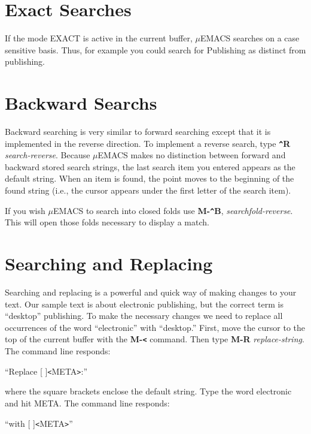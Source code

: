 \section{Exact Searches}

If the mode EXACT is active in the current buffer, $\mu$EMACS searches on a
case sensitive basis. Thus, for example you could search for Publishing
as distinct from publishing.

\section{Backward Searchs}

Backward searching is very similar to forward searching except that it
is implemented in the reverse direction. To implement a reverse search,
type {\bf \verb+^+R} {\it search-reverse}. Because $\mu$EMACS makes no
distinction between forward and backward stored search strings, the
last search item you entered appears as the default string. When an
item is found, the point moves to the beginning of the found string
(i.e., the cursor appears under the first letter of the search item).

If you wish $\mu$EMACS to search into closed folds use {\bf
M-\verb+^+B},  {\it searchfold-reverse}. This will open those folds
necessary to display a match.

\section{Searching and Replacing}

Searching and replacing is a powerful and quick way of making changes
to your text. Our sample text is about electronic publishing, but the
correct term is ``desktop'' publishing. To make the necessary changes
we need to replace all occurrences of the word ``electronic'' with
``desktop.'' First, move the cursor to the top of the current buffer
with the {\bf M-\verb+<+} command. Then type {\bf M-R} {\it replace-string}.
The command line responds:

``Replace [ ]\verb+<+META\verb+>+:''

where the square brackets enclose the default string. Type the word
electronic and hit META. The command line responds:

``with [ ]\verb+<+META\verb+>+''

